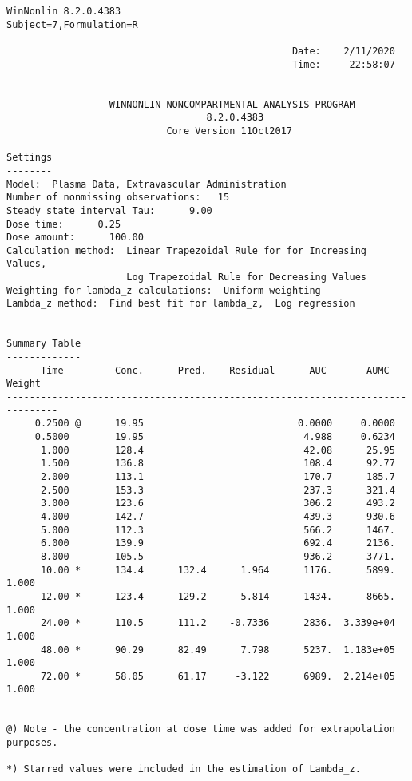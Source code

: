 \documentclass[12pt,a4paper]{article}
\begin{document}
\begin{verbatim}
WinNonlin 8.2.0.4383
Subject=7,Formulation=R

                                                  Date:    2/11/2020
                                                  Time:     22:58:07


                  WINNONLIN NONCOMPARTMENTAL ANALYSIS PROGRAM
                                   8.2.0.4383
                            Core Version 11Oct2017

Settings
--------
Model:  Plasma Data, Extravascular Administration
Number of nonmissing observations:   15
Steady state interval Tau:      9.00
Dose time:      0.25
Dose amount:      100.00
Calculation method:  Linear Trapezoidal Rule for for Increasing Values,
                     Log Trapezoidal Rule for Decreasing Values
Weighting for lambda_z calculations:  Uniform weighting
Lambda_z method:  Find best fit for lambda_z,  Log regression


Summary Table
-------------
      Time         Conc.      Pred.    Residual      AUC       AUMC      Weight
-------------------------------------------------------------------------------
     0.2500 @      19.95                           0.0000     0.0000
     0.5000        19.95                            4.988     0.6234
      1.000        128.4                            42.08      25.95
      1.500        136.8                            108.4      92.77
      2.000        113.1                            170.7      185.7
      2.500        153.3                            237.3      321.4
      3.000        123.6                            306.2      493.2
      4.000        142.7                            439.3      930.6
      5.000        112.3                            566.2      1467.
      6.000        139.9                            692.4      2136.
      8.000        105.5                            936.2      3771.
      10.00 *      134.4      132.4      1.964      1176.      5899.      1.000
      12.00 *      123.4      129.2     -5.814      1434.      8665.      1.000
      24.00 *      110.5      111.2    -0.7336      2836.  3.339e+04      1.000
      48.00 *      90.29      82.49      7.798      5237.  1.183e+05      1.000
      72.00 *      58.05      61.17     -3.122      6989.  2.214e+05      1.000


@) Note - the concentration at dose time was added for extrapolation purposes.

*) Starred values were included in the estimation of Lambda_z.



\end{verbatim}
\end{document}
